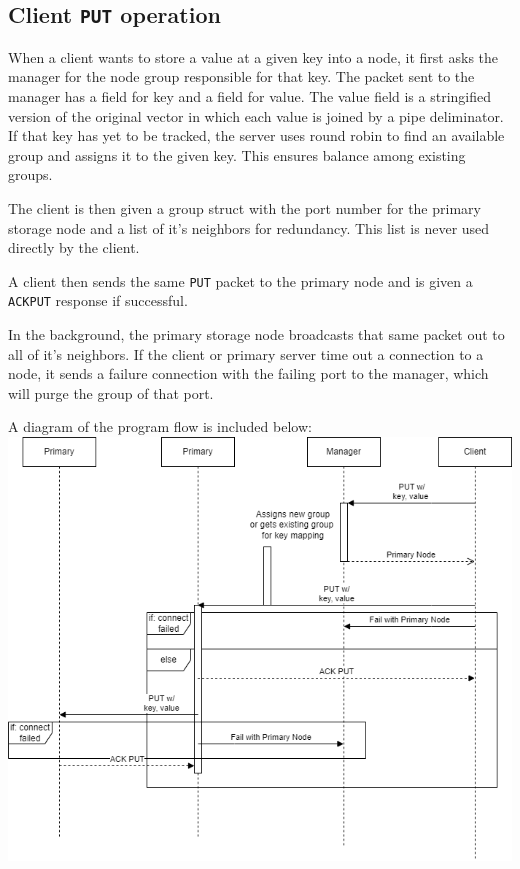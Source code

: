 \documentclass{article}
\begin{document}
\subsection{Client \texttt{PUT} operation}
When a client wants to store a value at a given key into a node, it first asks the manager for the node group responsible for that key.
The packet sent to the manager has a field for key and a field for value.
The value field is a stringified version of the original vector in which each value is joined by a pipe deliminator.
If that key has yet to be tracked, the server uses round robin to find an available group and assigns it to the given key. This ensures balance among
existing groups.

The client is then given a group struct with the port number for the primary storage node and a list of it's neighbors for redundancy. 
This list is never used directly by the client.

A client then sends the same \texttt{PUT} packet to the primary node and is given a \texttt{ACKPUT} response if successful.

In the background, the primary storage node broadcasts that same packet out to all of it's neighbors. If the client or primary server time out a connection
to a node, it sends a failure connection with the failing port to the manager, which will purge the group of that port. 

A diagram of the program flow is included below:\\

\includegraphics[width=\linewidth]{img/Put.drawio.png}
\end{document}
